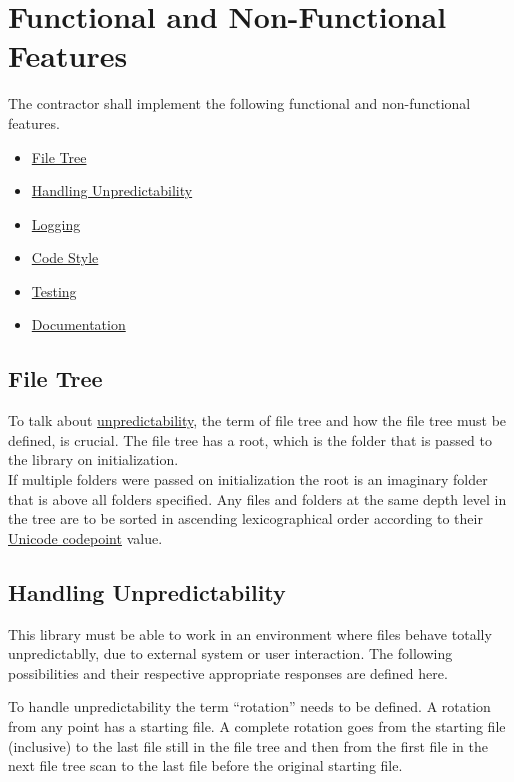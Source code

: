 \documentclass[11pt]{article} %
\begin{document}
    \section{Functional and Non-Functional Features}

    The contractor shall implement the following functional and non-functional features.
    \begin{itemize}
        \item[\ref{sec:3.1}] \hyperref[sec:3.1]{File Tree}
        \item[\ref{sec:3.2}] \hyperref[sec:3.2]{Handling Unpredictability}
        \item[\ref{sec:3.3}] \hyperref[sec:3.3]{Logging}
        \item[\ref{sec:3.4}] \hyperref[sec:3.4]{Code Style}
        \item[\ref{sec:3.5}] \hyperref[sec:3.5]{Testing}
        \item[\ref{sec:3.6}] \hyperref[sec:3.6]{Documentation}
    \end{itemize}


    \subsection{File Tree}\label{sec:3.1}

    To talk about \hyperref[sec:3.1]{unpredictability}, the term of file tree and how the file tree must be defined, is crucial. The file tree has a root, which is the folder that is passed to the library on initialization.\\If multiple folders were passed on initialization the root is an imaginary folder that is above all folders specified. Any files and folders at the same depth level in the tree are to be sorted in ascending lexicographical order according to their \href{https://en.wikipedia.org/wiki/Code_point}{Unicode codepoint} value.


    \subsection{Handling Unpredictability}\label{sec:3.2}

    This library must be able to work in an environment where files behave totally unpredictablly, due to external system or user interaction. The following possibilities and their respective appropriate responses are defined here.

    To handle unpredictability the term ``rotation'' needs to be defined. A rotation from any point has a starting file. A complete rotation goes from the starting file (inclusive) to the last file still in the file tree and then from the first file in the next file tree scan to the last file before the original starting file.
\end{document}
